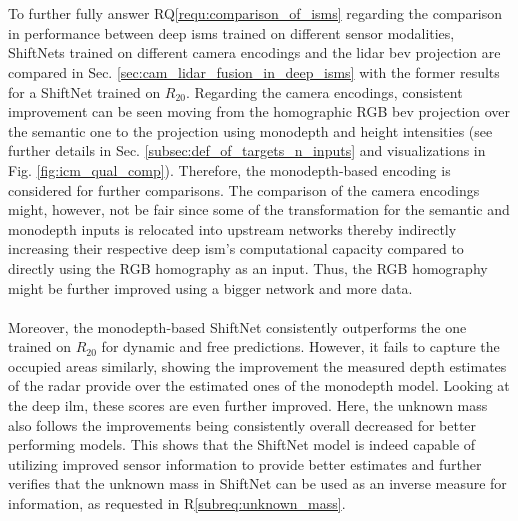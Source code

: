 \\\\
To further fully answer RQ\ref{requ:comparison_of_isms} regarding the comparison in performance between deep \gls{ism}s trained on different sensor modalities, ShiftNets trained on different camera encodings and the lidar \gls{bev} projection are compared in Sec. \ref{sec:cam_lidar_fusion_in_deep_isms} with the former results for a ShiftNet trained on $R_{20}$. Regarding the camera encodings, consistent improvement can be seen moving from the homographic RGB \gls{bev} projection over the semantic one to the projection using \gls{monodepth} and height intensities (see further details in Sec. \ref{subsec:def_of_targets_n_inputs} and visualizations in Fig. \ref{fig:icm_qual_comp}). Therefore, the \gls{monodepth}-based encoding is considered for further comparisons. The comparison of the camera encodings might, however, not be fair since some of the transformation for the semantic and \gls{monodepth} inputs is relocated into upstream networks thereby indirectly increasing their respective deep \gls{ism}'s computational capacity compared to directly using the RGB homography as an input. Thus, the RGB homography might be further improved using a bigger network and more data.
\\\\
Moreover, the \gls{monodepth}-based ShiftNet consistently outperforms the one trained on $R_{20}$ for dynamic and free predictions. However, it fails to capture the occupied areas similarly, showing the improvement the measured depth estimates of the radar provide over the estimated ones of the \gls{monodepth} model. Looking at the deep \gls{ilm}, these scores are even further improved. Here, the unknown mass also follows the improvements being consistently overall decreased for better performing models. This shows that the ShiftNet model is indeed capable of utilizing improved sensor information to provide better estimates and further verifies that the unknown mass in ShiftNet can be used as an inverse measure for information, as requested in R\ref{subreq:unknown_mass}.
\\\\ 
